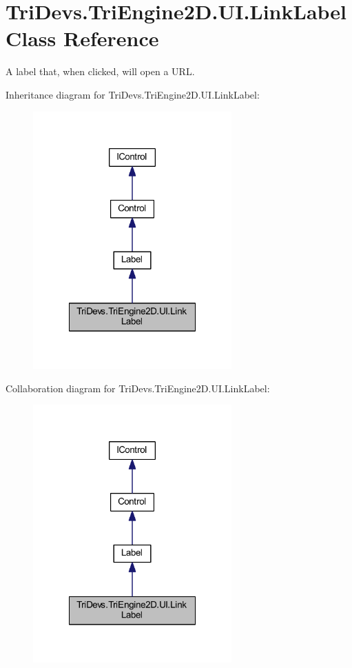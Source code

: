 \hypertarget{class_tri_devs_1_1_tri_engine2_d_1_1_u_i_1_1_link_label}{\section{Tri\-Devs.\-Tri\-Engine2\-D.\-U\-I.\-Link\-Label Class Reference}
\label{class_tri_devs_1_1_tri_engine2_d_1_1_u_i_1_1_link_label}
}


A label that, when clicked, will open a U\-R\-L.  




Inheritance diagram for Tri\-Devs.\-Tri\-Engine2\-D.\-U\-I.\-Link\-Label\-:
\nopagebreak
\begin{figure}[H]
\begin{center}
\leavevmode
\includegraphics[width=216pt]{class_tri_devs_1_1_tri_engine2_d_1_1_u_i_1_1_link_label__inherit__graph}
\end{center}
\end{figure}


Collaboration diagram for Tri\-Devs.\-Tri\-Engine2\-D.\-U\-I.\-Link\-Label\-:
\nopagebreak
\begin{figure}[H]
\begin{center}
\leavevmode
\includegraphics[width=216pt]{class_tri_devs_1_1_tri_engine2_d_1_1_u_i_1_1_link_label__coll__graph}
\end{center}
\end{figure}
